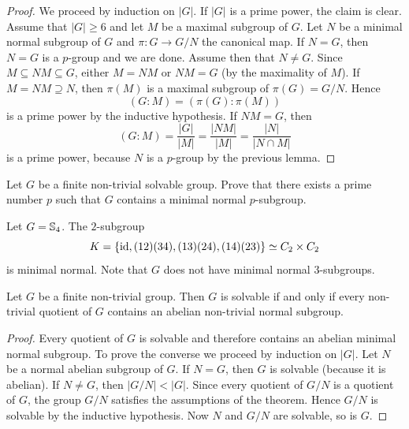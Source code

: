 \begin{proof}
	We proceed by induction on $|G|$.
	If $|G|$ is a prime power, the claim is clear. Assume that $|G|\geq6$ and let $M$ be a maximal subgroup of $G$. 
        Let $N$ be a minimal normal subgroup of $G$ and $\pi\colon G\to G/N$ the canonical map. 
	If $N=G$, then $N=G$ is a $p$-group and we are done. Assume then that 
	$N\ne G$. Since $M\subseteq NM\subseteq G$,
	either $M=NM$ or $NM=G$ (by the maximality of $M$).  If 
	$M=NM\supseteq N$, then $\pi(M)$ is a maximal subgroup of $\pi(G)=G/N$. Hence 
	\[
	(G:M)=(\pi(G):\pi(M))
	\]
	is a prime power by the inductive hypothesis. If 
	$NM=G$, then 
	\[
	(G:M)=\frac{|G|}{|M|}=\frac{|NM|}{|M|}=\frac{|N|}{|N\cap M|}
	\]
	is a prime power, because $N$ is a $p$-group by the previous lemma. 
\end{proof}

\begin{exercise}
    Let $G$ be a finite non-trivial solvable group. Prove that 
    there exists a prime number $p$ such that $G$ 
    contains a minimal normal $p$-subgroup. 
\end{exercise}

\begin{example}
	Let $G=\mathbb{S}_4$. The $2$-subgroup 
	\[
	K=\{\operatorname{id},(12)(34),(13)(24),(14)(23)\}\simeq
	C_2\times C_2
	\]
	is minimal normal. Note that $G$ does not have minimal normal $3$-subgroups. 
\end{example}

\begin{theorem}
Let $G$ be a finite non-trivial group. Then $G$ is solvable if and only if 
every non-trivial quotient of $G$ contains an abelian non-trivial normal subgroup. 
\end{theorem}

\begin{proof}
Every quotient of $G$ is solvable and therefore contains an abelian 
minimal normal subgroup. To prove the converse we proceed by induction on $|G|$. Let 
$N$ be a normal abelian subgroup of $G$. If $N=G$, then $G$ is solvable (because it is abelian). If 
$N\ne G$, then $|G/N|<|G|$. Since every quotient of $G/N$ is a quotient of $G$, the group 
$G/N$ satisfies the assumptions of the theorem. Hence $G/N$ is solvable by the inductive hypothesis. 
Now $N$ and $G/N$ are solvable, so is $G$. 
\end{proof}


